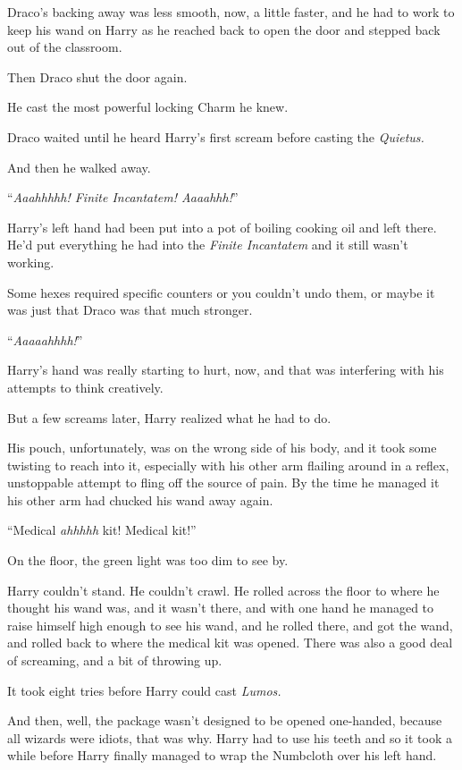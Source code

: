 Draco’s backing away was less smooth, now, a little faster, and he had to work to keep his wand on Harry as he reached back to open the door and stepped back out of the classroom.

Then Draco shut the door again.

He cast the most powerful locking Charm he knew.

Draco waited until he heard Harry’s first scream before casting the \emph{Quietus.}

And then he walked away.

\later

“\emph{Aaahhhhh! Finite Incantatem! Aaaahhh!}”

Harry’s left hand had been put into a pot of boiling cooking oil and left there. He’d put everything he had into the \emph{Finite Incantatem} and it still wasn’t working.

Some hexes required specific counters or you couldn’t undo them, or maybe it was just that Draco was that much stronger.

“\emph{Aaaaahhhh!}”

Harry’s hand was really starting to hurt, now, and that was interfering with his attempts to think creatively.

But a few screams later, Harry realized what he had to do.

His pouch, unfortunately, was on the wrong side of his body, and it took some twisting to reach into it, especially with his other arm flailing around in a reflex, unstoppable attempt to fling off the source of pain. By the time he managed it his other arm had chucked his wand away again.

“Medical \emph{ahhhhh} kit! Medical kit!”

On the floor, the green light was too dim to see by.

Harry couldn’t stand. He couldn’t crawl. He rolled across the floor to where he thought his wand was, and it wasn’t there, and with one hand he managed to raise himself high enough to see his wand, and he rolled there, and got the wand, and rolled back to where the medical kit was opened. There was also a good deal of screaming, and a bit of throwing up.

It took eight tries before Harry could cast \emph{Lumos.}

And then, well, the package wasn’t designed to be opened one-handed, because all wizards were idiots, that was why. Harry had to use his teeth and so it took a while before Harry finally managed to wrap the Numbcloth over his left hand.

